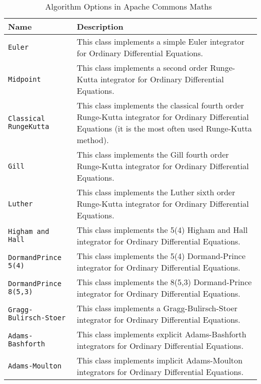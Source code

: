 \begin{table}[ht]
\begin{tabular}{ p{} p{} }
	\textbf{Name} & \textbf{Description} \\
	\toprule
	\verb|Euler| & This class implements a simple Euler integrator for Ordinary Differential Equations.\\ \hline
	\verb|Midpoint| & This class implements a second order Runge-Kutta integrator for Ordinary Differential Equations.\\ \hline
	\verb|Classical RungeKutta| & This class implements the classical fourth order Runge-Kutta integrator for Ordinary Differential Equations (it is the most often used Runge-Kutta method).\\ \hline
	\verb|Gill| & This class implements the Gill fourth order Runge-Kutta integrator for Ordinary Differential Equations.\\ \hline
	\verb|Luther| & This class implements the Luther sixth order Runge-Kutta integrator for Ordinary Differential Equations.\\ \hline
	\verb|Higham and Hall| & This class implements the 5(4) Higham and Hall integrator for Ordinary Differential Equations.\\ \hline
	\verb|DormandPrince 5(4)| & This class implements the 5(4) Dormand-Prince integrator for Ordinary Differential Equations.\\ \hline
	\verb|DormandPrince 8(5,3)| & This class implements the 8(5,3) Dormand-Prince integrator for Ordinary Differential Equations.\\ \hline
	\verb|Gragg-Bulirsch-Stoer| & This class implements a Gragg-Bulirsch-Stoer integrator for Ordinary Differential Equations.\\ \hline
	\verb|Adams-Bashforth| & This class implements explicit Adams-Bashforth integrators for Ordinary Differential Equations.\\ \hline
	\verb|Adams-Moulton| & This class implements implicit Adams-Moulton integrators for Ordinary Differential Equations.\\
	\bottomrule	
\end{tabular}	
\caption{Algorithm Options in Apache Commons Maths~\citep{apachefun}}	
\label{tab_algacm}
\end{table}

